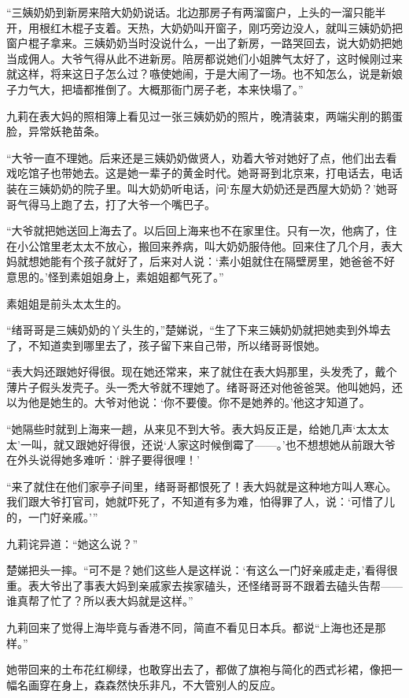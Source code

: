 \par “三姨奶奶到新房来陪大奶奶说话。北边那房子有两溜窗户，上头的一溜只能半开，用根红木棍子支着。天热，大奶奶叫开窗子，刚巧旁边没人，就叫三姨奶奶把窗户棍子拿来。三姨奶奶当时没说什么，一出了新房，一路哭回去，说大奶奶把她当成佣人。大爷气得从此不进新房。陪房都说她们小姐脾气太好了，这时候刚过来就这样，将来这日子怎么过？嗾使她闹，于是大闹了一场。也不知怎么，说是新娘子力气大，把墙都推倒了。大概那衙门房子老，本来快塌了。”
\par 九莉在表大妈的照相簿上看见过一张三姨奶奶的照片，晚清装束，两端尖削的鹅蛋脸，异常妖艳苗条。
\par “大爷一直不理她。后来还是三姨奶奶做贤人，劝着大爷对她好了点，他们出去看戏吃馆子也带她去。这是她一辈子的黄金时代。她哥哥到北京来，打电话去，电话装在三姨奶奶的院子里。叫大奶奶听电话，问‘东屋大奶奶还是西屋大奶奶？’她哥哥气得马上跑了去，打了大爷一个嘴巴子。
\par “大爷就把她送回上海去了。以后回上海来也不在家里住。只有一次，他病了，住在小公馆里老太太不放心，搬回来养病，叫大奶奶服侍他。回来住了几个月，表大妈就想她能有个孩子就好了，后来对人说：‘素小姐就住在隔壁房里，她爸爸不好意思的。’怪到素姐姐身上，素姐姐都气死了。”
\par 素姐姐是前头太太生的。
\par “绪哥哥是三姨奶奶的丫头生的，”楚娣说，“生了下来三姨奶奶就把她卖到外埠去了，不知道卖到哪里去了，孩子留下来自己带，所以绪哥哥恨她。
\par “表大妈还跟她好得很。现在她还常来，来了就住在表大妈那里，头发秃了，戴个薄片子假头发壳子。头一秃大爷就不理她了。绪哥哥还对他爸爸哭。他叫她妈，还以为他是她生的。大爷对他说：‘你不要傻。你不是她养的。’他这才知道了。
\par “她隔些时就到上海来一趟，从来见不到大爷。表大妈反正是，给她几声‘太太太太’一叫，就又跟她好得很，还说‘人家这时候倒霉了——。’也不想想她从前跟大爷在外头说得她多难听：‘胖子要得很哩！’
\par “来了就住在他们家亭子间里，绪哥哥都恨死了！表大妈就是这种地方叫人寒心。我们跟大爷打官司，她就吓死了，不知道有多为难，怕得罪了人，说：‘可惜了儿的，一门好亲戚。'”
\par 九莉诧异道：“她这么说？”
\par 楚娣把头一摔。“可不是？她们这些人是这样说：‘有这么一门好亲戚走走，’看得很重。表大爷出了事表大妈到亲戚家去挨家磕头，还怪绪哥哥不跟着去磕头告帮——谁真帮了忙了？所以表大妈就是这样。”
\par 九莉回来了觉得上海毕竟与香港不同，简直不看见日本兵。都说“上海也还是那样。”
\par 她带回来的土布花红柳绿，也敢穿出去了，都做了旗袍与简化的西式衫裙，像把一幅名画穿在身上，森森然快乐非凡，不大管别人的反应。
